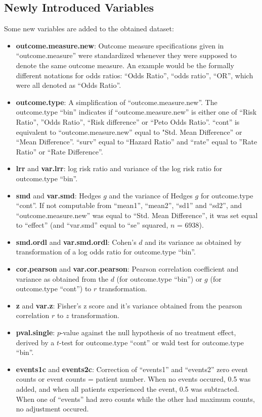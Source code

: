 \subsection{Newly Introduced Variables}
Some new variables are added to the obtained dataset:
\begin{itemize}
\item \textbf{outcome.measure.new}: Outcome measure specifications given in ``outcome.measure'' were standardized whenever they were supposed to denote the same outcome measure. An example would be the formally different notations for odds ratios: ``Odds Ratio'', ``odds ratio'', ``OR'', which were all denoted as ``Odds Ratio''.
\item \textbf{outcome.type}: A simplification of ``outcome.measure.new''. The outcome.type ``bin'' indicates if ``outcome.measure.new'' is either one of ``Risk Ratio'', ''Odds Ratio'', ``Risk difference'' or ``Peto Odds Ratio''. ``cont'' is equivalent to ``outcome.measure.new'' equal to "Std. Mean Difference'' or ``Mean Difference''. ``surv'' equal to ``Hazard Ratio'' and ``rate'' equal to ''Rate Ratio'' or ``Rate Difference''.
\item \textbf{lrr} and \textbf{var.lrr}: log risk ratio and variance of the log risk ratio for outcome.type ``bin''.
\item \textbf{smd} and \textbf{var.smd}: Hedges $g$ and the variance of Hedges $g$ for outcome.type ``cont''. If not computable from ``mean1'', ``mean2'', ``sd1'' and ``sd2'', and ``outcome.measure.new'' was equal to ``Std. Mean Difference'', it was set equal to ``effect'' (and ``var.smd'' equal to ``se'' squared, $n$ =  6938).
\item \textbf{smd.ordl} and \textbf{var.smd.ordl}: Cohen's $d$ and its variance as obtained by transformation of a log odds ratio for outcome.type ``bin''.
\item \textbf{cor.pearson} and \textbf{var.cor.pearson}: Pearson correlation coefficient and variance as obtained from the $d$ (for outcome.type ``bin'') or $g$ (for outcome.type ``cont'') to $r$ transformation.
\item \textbf{z} and \textbf{var.z}: Fisher's z score and it's variance obtained from the pearson correlation $r$ to $z$ transformation.
\item \textbf{pval.single}: $p$-value against the null hypothesis of no treatment effect, derived by a $t$-test for outcome.type ``cont'' or wald test for outcome.type ``bin''.
\item \textbf{events1c} and \textbf{events2c}: Correction of ``events1'' and ``events2'' zero event counts or event counts = patient number. When no events occured, 0.5 was added, and when all patients experienced the event, 0.5 was subtracted. When one of ``events'' had zero counts while the other had maximum counts, no adjustment occured.

\end{itemize}
